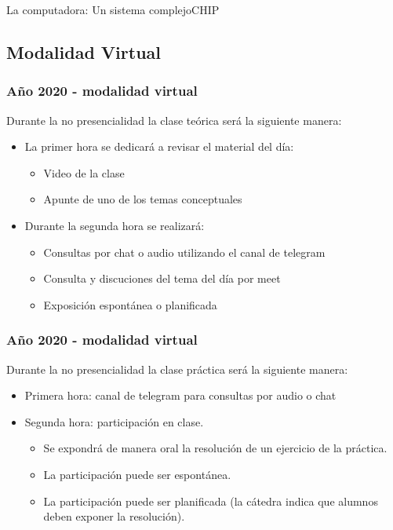 \documentclass[aspectratio=169,compress]{beamer}
\begin{document}
\begin{frame}{La computadora: Un sistema complejo}{CHIP}





\subsection{Modalidad Virtual}


\begin{frame}[fragile]
  \frametitle{Año 2020 - modalidad virtual}
  Durante la no presencialidad la clase teórica será la siguiente manera:

\bigskip
\begin{itemize}
\item La primer hora se dedicará a revisar el material del día:
\begin{itemize}
\item Video de la clase
\item Apunte de uno de los temas conceptuales
\end{itemize}
\end{itemize}

\bigskip

\begin{itemize}
\item Durante la segunda hora se realizará:
\begin{itemize}
\item Consultas por chat o audio utilizando el canal de telegram
\item Consulta y discuciones del tema del día por meet
\item Exposición espontánea o planificada
\end{itemize}
\end{itemize}

\end{frame}

\begin{frame}[fragile]
  \frametitle{Año 2020 - modalidad virtual}
  Durante la no presencialidad la clase práctica será la siguiente manera:

\bigskip
\begin{itemize}
\item Primera hora: canal de telegram para consultas por audio o chat
\bigskip
\item Segunda hora: participación en clase.
\begin{itemize}
\item Se expondrá de manera oral la resolución de un ejercicio de la práctica.
\item La participación puede ser espontánea.
\item La participación puede ser planificada (la cátedra indica que alumnos deben exponer la resolución).
\end{itemize}
\end{itemize}


\end{frame}
\end{frame}
\end{document}
